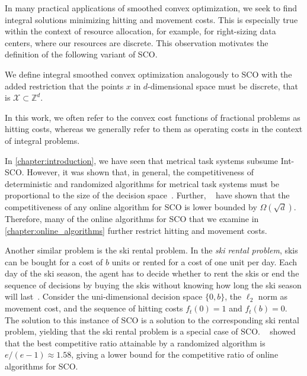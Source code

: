 In many practical applications of smoothed convex optimization, we seek to find integral solutions minimizing hitting and movement costs. This is especially true within the context of resource allocation, for example, for right-sizing data centers, where our resources are discrete. This observation motivates the definition of the following variant of SCO.

\begin{problem}
We define integral smoothed convex optimization analogously to SCO with the added restriction that the points $x$ in $d$-dimensional space must be discrete, that is $\mathcal{X} \subset \mathbb{Z}^d$.
\end{problem}

In this work, we often refer to the convex cost functions of fractional problems as hitting costs, whereas we generally refer to them as operating costs in the context of integral problems.

In \cref{chapter:introduction}, we have seen that metrical task systems subsume Int-SCO. However, it was shown that, in general, the competitiveness of deterministic and randomized algorithms for metrical task systems must be proportional to the size of the decision space~\cite{Blum1992, Borodin1992}. Further, \citeauthor*{Chen2018}~\cite{Chen2018} have shown that the competitiveness of any online algorithm for SCO is lower bounded by $\Omega(\sqrt{d})$. Therefore, many of the online algorithms for SCO that we examine in \cref{chapter:online_algorithms} further restrict hitting and movement costs.

Another similar problem is the ski rental problem. In the \emph{ski rental problem}, skis can be bought for a cost of $b$ units or rented for a cost of one unit per day. Each day of the ski season, the agent has to decide whether to rent the skis or end the sequence of decisions by buying the skis without knowing how long the ski season will last~\cite{Shah2021}. Consider the uni-dimensional decision space $\{0,b\}$, the $\ell_2$ norm as movement cost, and the sequence of hitting costs $f_t(0) = 1$ and $f_t(b) = 0$. The solution to this instance of SCO is a solution to the corresponding ski rental problem, yielding that the ski rental problem is a special case of SCO. \citeauthor*{Karlin1990}~\cite{Karlin1990} showed that the best competitive ratio attainable by a randomized algorithm is $e/(e-1) \approx 1.58$, giving a lower bound for the competitive ratio of online algorithms for SCO.

